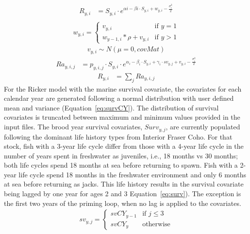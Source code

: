 \documentclass[11pt]{book}
\begin{document}
\begin{align}
  R_{y,i} &= S_{y,i} \cdot e^{\alpha{i} - \beta{i} \cdot S_{y,i} + w_{y,i} - \frac{\sigma_{i}^{2}}{2}}\\
  \label{eq:Rickersimple}
\end{align}
\begin{align}
 w_{y,i} = 
\begin{cases}
 v_{y,i} & \text{if } y = 1 \\
 w_{y-1,i} * \rho + v_{y,i} & \text{if } y > 1
\end{cases}
\end{align}
\begin{align}
  v_{y,i} \sim N(\mu=0,covMat)
  \label{eq:CUautocorr}
\end{align}
\begin{align}
  Ra_{y,i,j} &= p_{y,i,j} \cdot S_{y,i} \cdot e^{\alpha_{i} - \beta_{i} \cdot S_{y,i} + \gamma_{i} \cdot sv_{y,j} + v_{y,i} - \frac{\sigma_{i}^{2}}{2}}
  \label{eq:Rickersurv}
\end{align}
\begin{align}
  R_{y,i} &= \sum_{j}Ra_{y,i,j}
  \label{eq:Rickersurvsum}
\end{align}
For the Ricker model with the marine survival covariate, the covariates for each calendar year are generated following a normal distribution with user defined mean and variance (Equation~\ref{eq:survCY}). The distribution of survival covariates is truncated between maximum and minimum values provided in the input files. The brood year survival covariates, \(Surv_{y,j}\), are currently populated following the dominant life history types from Interior Fraser Coho. For that stock, fish with a 3-year life cycle differ from those with a 4-year life cycle in the number of years spent in freshwater as juveniles, i.e., 18 months vs 30 months; both life cycles spend 18 months at sea before returning to spawn. Fish with a 2-year life cycle spend 18 months in the freshwater environment and only 6 months at sea before returning as jacks. This life history results in the survival covariate being lagged by one year for ages 2 and 3 Equation~\ref{eq:surv}). The exception is the first two years of the priming loop, when no lag is applied to the covariates.
\begin{align}
sv_{y,j} = 
\begin{cases}
 svCY_{y-1} & \text{if } j\leq 3 \\
 svCY_{y} & \text{otherwise}
\end{cases}
 \label{eq:surv}
\end{align}
\end{document}
